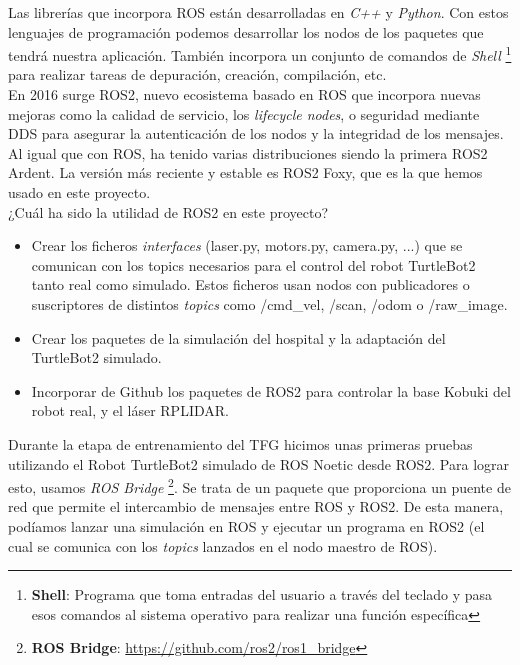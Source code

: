 Las librerías que incorpora ROS están desarrolladas en \textit{C++} y \textit{Python}. Con estos lenguajes de programación podemos desarrollar los nodos de los paquetes que tendrá nuestra aplicación. También incorpora un conjunto de comandos de \textit{Shell} \footnote{\textbf{Shell}: Programa que toma entradas del usuario a través del teclado y pasa esos comandos al sistema operativo para realizar una función específica} para realizar tareas de depuración, creación, compilación, etc.\\

En 2016 surge ROS2, nuevo ecosistema basado en ROS que incorpora nuevas mejoras como la calidad de servicio, los \textit{lifecycle nodes}, o seguridad mediante DDS para asegurar la autenticación de los nodos y la integridad de los mensajes. Al igual que con ROS, ha tenido varias distribuciones siendo la primera ROS2 Ardent. La versión más reciente y estable es ROS2 Foxy, que es la que hemos usado en este proyecto.\\

¿Cuál ha sido la utilidad de ROS2 en este proyecto?
\begin{itemize}
	\item Crear los ficheros \textit{interfaces} (laser.py, motors.py, camera.py, ...) que se comunican con los topics necesarios para el control del robot TurtleBot2 tanto real como simulado. Estos ficheros usan nodos con publicadores o suscriptores de distintos \textit{topics} como /cmd\_vel, /scan, /odom o /raw\_image.
	\item Crear los paquetes de la simulación del hospital y la adaptación del TurtleBot2 simulado.
	\item Incorporar de Github los paquetes de ROS2 para controlar la base Kobuki del robot real, y el láser RPLIDAR.
\end{itemize}

Durante la etapa de entrenamiento del TFG hicimos unas primeras pruebas utilizando el Robot TurtleBot2 simulado de ROS Noetic desde ROS2. Para lograr esto, usamos \textit{ROS Bridge} \footnote{\textbf{ROS Bridge}: \url{https://github.com/ros2/ros1_bridge}}. Se trata de un paquete que proporciona un puente de red que permite el intercambio de mensajes entre ROS y ROS2. De esta manera, podíamos lanzar una simulación en ROS y ejecutar un programa en ROS2 (el cual se comunica con los \textit{topics} lanzados en el nodo maestro de ROS).\\




